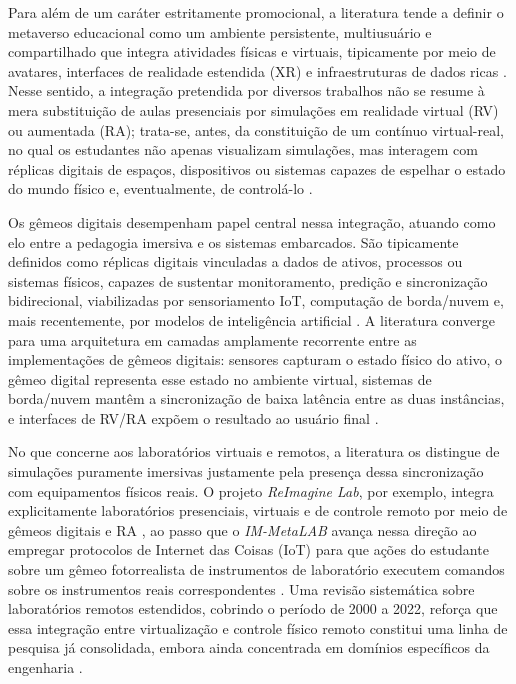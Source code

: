 \documentclass[12pt]{article}
\begin{document}
Para além de um caráter estritamente promocional, a literatura tende a definir o metaverso educacional como um ambiente persistente, multiusuário e compartilhado que integra atividades físicas e virtuais, tipicamente por meio de avatares, interfaces de realidade estendida (XR) e infraestruturas de dados ricas \cite{Wang2022Constructing, PenaRios2023Guest, Chen2026Metaverse}. Nesse sentido, a integração pretendida por diversos trabalhos não se resume à mera substituição de aulas presenciais por simulações em realidade virtual (RV) ou aumentada (RA); trata-se, antes, da constituição de um contínuo virtual-real, no qual os estudantes não apenas visualizam simulações, mas interagem com réplicas digitais de espaços, dispositivos ou sistemas capazes de espelhar o estado do mundo físico e, eventualmente, de controlá-lo \cite{Mitra2023Metaverse, Li2022When, Mihai2022Digital}.

Os gêmeos digitais desempenham papel central nessa integração, atuando como elo entre a pedagogia imersiva e os sistemas embarcados. São tipicamente definidos como réplicas digitais vinculadas a dados de ativos, processos ou sistemas físicos, capazes de sustentar monitoramento, predição e sincronização bidirecional, viabilizadas por sensoriamento IoT, computação de borda/nuvem e, mais recentemente, por modelos de inteligência artificial \cite{Li2022When, Mihai2022Digital, Yu2022BiDirectional, VanHuynh2022Edge}. A literatura converge para uma arquitetura em camadas amplamente recorrente entre as implementações de gêmeos digitais: sensores capturam o estado físico do ativo, o gêmeo digital representa esse estado no ambiente virtual, sistemas de borda/nuvem mantêm a sincronização de baixa latência entre as duas instâncias, e interfaces de RV/RA expõem o resultado ao usuário final \cite{Schroeder2021Methodology, Albalkhy2024Digital, Jagatheesaperumal2023SemanticAware}.

No que concerne aos laboratórios virtuais e remotos, a literatura os distingue de simulações puramente imersivas justamente pela presença dessa sincronização com equipamentos físicos reais. O projeto \textit{ReImagine Lab}, por exemplo, integra explicitamente laboratórios presenciais, virtuais e de controle remoto por meio de gêmeos digitais e RA \cite{Alsaleh2022ReImagine}, ao passo que o \textit{IM-MetaLAB} avança nessa direção ao empregar protocolos de Internet das Coisas (IoT) para que ações do estudante sobre um gêmeo fotorrealista de instrumentos de laboratório executem comandos sobre os instrumentos reais correspondentes \cite{Bonavolonta2025IMMetaLAB}. Uma revisão sistemática sobre laboratórios remotos estendidos, cobrindo o período de 2000 a 2022, reforça que essa integração entre virtualização e controle físico remoto constitui uma linha de pesquisa já consolidada, embora ainda concentrada em domínios específicos da engenharia \cite{Silva2023Extended}.
\end{document}
